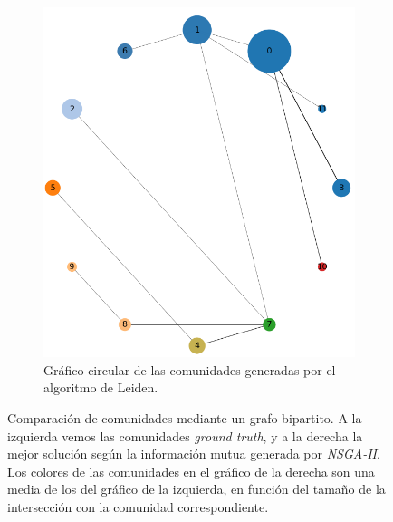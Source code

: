 \begin{figure}[!htb]
\begin{subfigure}{.4\textwidth}
    \includegraphics[width=.9\linewidth]{img/3_best_sol_circular_comp_2}
    \caption{Gráfico circular de las comunidades generadas por el algoritmo de Leiden. }
    \label{fig:3-circular-comp-2}
  \end{subfigure}
  \caption{Comparación de comunidades mediante un grafo bipartito. A la
    izquierda vemos las comunidades \emph{ground truth}, y a la derecha la
    mejor solución según la información mutua generada por \emph{NSGA-II}. Los
    colores de las comunidades en el gráfico de la derecha son una media de los
    del gráfico de la izquierda, en función del tamaño de la intersección con la
    comunidad correspondiente.}
  \label{fig:3-circular-comp}
\end{figure}

